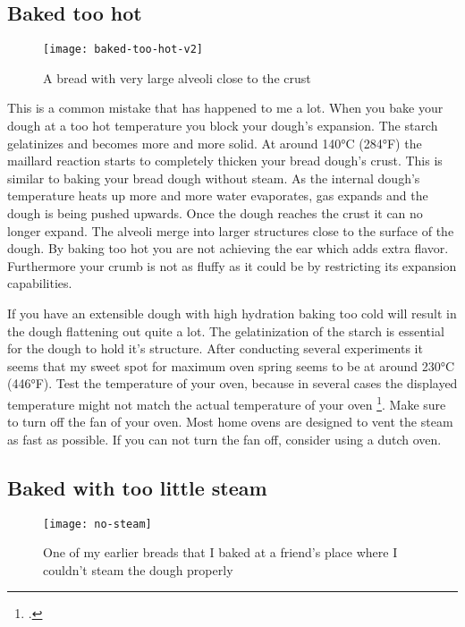 \subsection{Baked too hot}

\begin{figure}
  \texttt{[image: baked-too-hot-v2]}
  \caption{A bread with very large alveoli close to the crust}
  \label{baked-too-hot}
\end{figure}

This is a common mistake that has happened to me a lot. When you bake your dough
at a too hot temperature you block your dough's expansion. The starch gelatinizes
and becomes more and more solid. At around 140°C (284°F) the maillard reaction
starts to completely thicken your bread dough's crust. This is similar to baking
your bread dough without steam. As the internal dough's temperature heats up
more and more water evaporates, gas expands and the dough is being pushed upwards.
Once the dough reaches the crust it can no longer expand. The alveoli merge
into larger structures close to the surface of the dough. By baking too hot
you are not achieving the ear which adds extra flavor. Furthermore your crumb
is not as fluffy as it could be by restricting its expansion capabilities.

If you have an extensible dough with high hydration baking too cold will result
in the dough flattening out quite a lot. The gelatinization of the starch is
essential for the dough to hold it's structure. After conducting several
experiments it seems that my sweet spot for maximum oven spring seems to be
at around 230°C (446°F). Test the temperature of your oven, because in several
cases the displayed temperature might not match the actual temperature of your
oven \footcite{too+hot+baking}. Make sure to turn off the fan of your oven. Most
home ovens are designed to vent the steam as fast as possible. If you can not
turn the fan off, consider using a dutch oven.

\subsection{Baked with too little steam}

\begin{figure}[h]
  \texttt{[image: no-steam]}
  \caption{One of my earlier breads that I baked at a friend's place where
  I couldn't steam the dough properly}
  \label{no-steam}
\end{figure}

